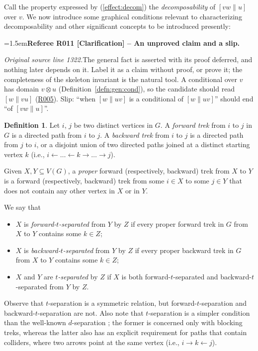 \documentclass[12pt]{amsart}
\newcommand{\RefereeRemark}[4]{%
  \par\medskip\begingroup\normalfont\small\color{RefereePurple}%
  \emergencystretch=1.5em\noindent\textbf{Referee R#1 [#2] -- #3.}\par\nobreak\noindent #4\par
  \endgroup\medskip
}
\theoremstyle{plain}
\theoremstyle{definition}
\newtheorem{defn}[thm]{Definition}
\theoremstyle{remark}
\numberwithin{equation}{section}
\theoremstyle{plain}
\newcommand{\0}{\emptyset}
\newcommand{\sub}{\subseteq}
\newcommand{\memph}[1]{{\color{magenta}\emph{#1}}}
\begin{document}
Call the property expressed by (\ref{effect:decom}) the \memph{decomposability} of $[vw\|u]$ over $v$. We now introduce some graphical conditions relevant to characterizing  decomposability and other significant concepts to be introduced presently:
\hypertarget{review-011}{}\RefereeRemark{011}{Clarification}{An unproved claim and a slip}{%
\textit{Original source line 1322.}\quad The general fact is asserted with its proof deferred, and nothing later depends on it. Label it as a claim without proof, or prove it; the completeness of the skeleton invariant \cite[Lemma~4.4]{YinZhangModularity} is the natural tool. A conditional over $v$ has domain $v \otimes u$ (Definition~\ref{defn:gen:cond}), so the candidate should read $[w \| vu]$ (\hyperlink{review-005}{R005}). Slip: ``when $[w \| uv]$ is a conditional of $[w \| uv]$'' should end ``of $[vw \| u]$''.
}

\begin{defn}\label{def:separation}
Let  $i$, $j$ be two distinct vertices in $G$. A \memph{forward trek} from $i$ to $j$ in $G$ is a directed path from $i$ to $j$. A \memph{backward trek} from $i$ to $j$ is a directed path from $j$ to $i$, or a disjoint union of two directed paths joined at a distinct starting vertex $k$ (i.e., $i\leftarrow \dots \leftarrow k \rightarrow \dots \rightarrow j$).

Given $X, Y \sub V(G)$, a \memph{proper} forward (respectively, backward) trek from $X$ to $Y$ is a forward (respectively, backward) trek from some $i\in X$ to some $j\in Y$ that does not contain any other vertex in $X$ or in $Y$.

We say that
\begin{itemize}
  \item $X$ is \memph{forward-$t$-separated} from $Y$ by $Z$ if every proper forward trek in $G$ from $X$ to $Y$ contains some $k \in Z$;
  \item $X$ is \memph{backward-$t$-separated} from $Y$ by $Z$ if every proper backward trek in $G$ from $X$ to $Y$ contains some $k \in Z$;
  \item $X$ and $Y$ are \memph{$t$-separated} by $Z$ if $X$ is both forward-$t$-separated and backward-$t$-separated from $Y$ by $Z$.
\end{itemize}
\end{defn}

Observe that $t$-separation is a symmetric relation, but forward-$t$-separation and backward-$t$-separation are not.
Also note that $t$-separation is a simpler condition than the well-known $d$-separation \cite{Pearl1988}; the former is concerned only with blocking treks, whereas the latter also has an explicit requirement for paths that contain colliders, where two arrows point at the same vertex (i.e., $i\rightarrow k \leftarrow j$).
\end{document}
